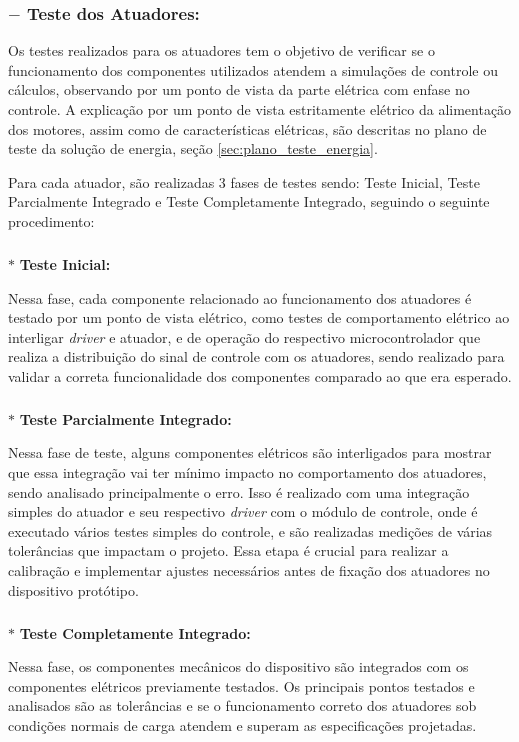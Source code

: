 \subsubsection*{$-$ Teste dos Atuadores:}

Os testes realizados para os atuadores tem o objetivo de verificar se o funcionamento dos componentes utilizados atendem a simulações de controle ou cálculos, observando por um ponto de vista da parte elétrica com enfase no controle. A explicação por um ponto de vista estritamente elétrico da alimentação dos motores, assim como de características elétricas, são descritas no plano de teste da solução de energia, seção \ref{sec:plano_teste_energia}.

Para cada atuador, são realizadas 3 fases de testes sendo: Teste Inicial, Teste Parcialmente Integrado e Teste Completamente Integrado, seguindo o seguinte procedimento:

\subparagraph*{} $*$ \textbf{Teste Inicial:}
    
Nessa fase, cada componente relacionado ao funcionamento dos atuadores é testado por um ponto de vista elétrico, como testes de comportamento elétrico ao interligar \textit{driver} e atuador, e de operação do respectivo microcontrolador que realiza a distribuição do sinal de controle com os atuadores, sendo realizado para validar a correta funcionalidade dos componentes comparado ao que era esperado.
    
\subparagraph*{} $*$ \textbf{Teste Parcialmente Integrado:} \hfill 

Nessa fase de teste, alguns componentes elétricos são interligados para mostrar que essa integração vai ter mínimo impacto no comportamento dos atuadores, sendo analisado principalmente o erro. Isso é realizado com uma integração simples do atuador e seu respectivo \textit{driver} com o módulo de controle, onde é executado vários testes simples do controle, e são realizadas medições de várias tolerâncias que impactam o projeto. Essa etapa é crucial para realizar a calibração e implementar ajustes necessários antes de fixação dos atuadores no dispositivo protótipo.
    
\subparagraph*{} $*$ \textbf{Teste Completamente Integrado:} \hfill

Nessa fase, os componentes mecânicos do dispositivo são integrados com os componentes elétricos previamente testados. Os principais pontos testados e analisados são as tolerâncias e se o funcionamento correto dos atuadores sob condições normais de carga atendem e superam as especificações projetadas. 

